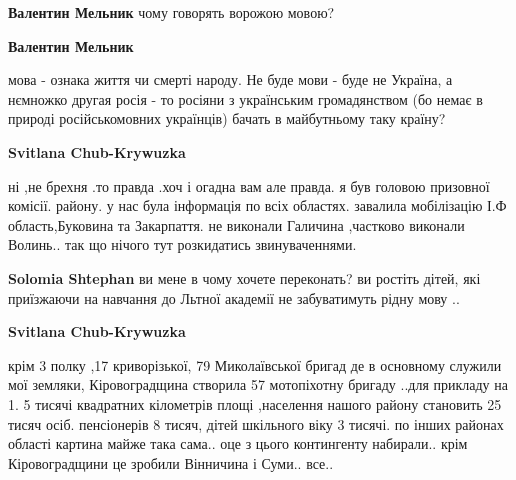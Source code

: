 \begin{itemize}
\begin{itemize}
\textbf{Валентин Мельник} чому говорять ворожою мовою?

 
\textbf{Валентин Мельник} 

мова - ознака життя чи смерті народу. Не буде мови - буде не Україна, а
нємножко другая росія - то росіяни з українським громадянством (бо немає в
природі російськомовних українців) бачать в майбутньому таку країну?

 
\textbf{Svitlana Chub-Krywuzka} 

ні ,не брехня .то правда .хоч і огадна вам але правда. я був головою призовної
комісії. району. у нас була інформація по всіх областях. завалила мобілізацію
І.Ф область,Буковина та Закарпаття. не виконали Галичина ,частково виконали
Волинь.. так що нічого тут розкидатись звинуваченнями.



 
\textbf{Solomia Shtephan} ви мене в чому хочете переконать? ви ростіть
дітей, які приїзжаючи на навчання до Льтної академії не забуватимуть рідну мову
..

 
\textbf{Svitlana Chub-Krywuzka} 

крім 3 полку ,17 криворізької, 79 Миколаївської бригад де в основному служили
мої земляки, Кіровоградщина створила 57 мотопіхотну бригаду ..для прикладу на
1. 5 тисячі квадратних кілометрів площі ,населення нашого району становить 25
тисяч осіб. пенсіонерів 8 тисяч, дітей шкільного віку 3 тисячі. по інших
районах області картина майже така сама.. оце з цього контингенту набирали..
крім Кіровоградщини це зробили Вінничина і Суми.. все..


\end{itemize}
\end{itemize}
